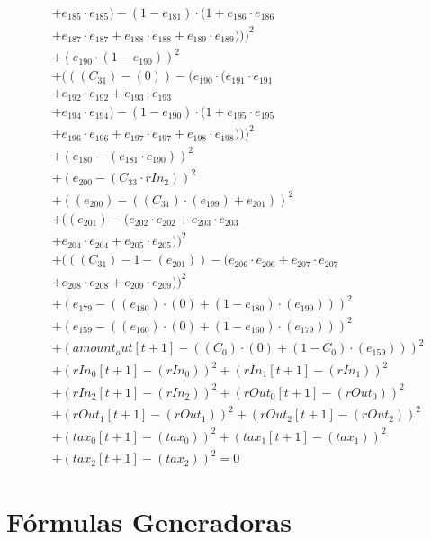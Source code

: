 \documentclass[10pt, a4paper]{article}
\begin{document}
\begin{align*}
& + e_{185} \cdot e_{185}) - (1 - e_{181}) \cdot (1 + e_{186} \cdot e_{186} \\
& + e_{187} \cdot e_{187} + e_{188} \cdot e_{188} + e_{189} \cdot e_{189})))^{2} \\
& + (e_{190} \cdot (1 - e_{190}))^{2} \\
& + (((C_{31}) - (0)) - (e_{190} \cdot (e_{191} \cdot e_{191} \\
& + e_{192} \cdot e_{192} + e_{193} \cdot e_{193} \\
& + e_{194} \cdot e_{194}) - (1 - e_{190}) \cdot (1 + e_{195} \cdot e_{195} \\
& + e_{196} \cdot e_{196} + e_{197} \cdot e_{197} + e_{198} \cdot e_{198})))^{2} \\
& + (e_{180} - (e_{181} \cdot e_{190}))^{2} \\
& + (e_{200} - (C_{33}  \cdot  rIn_2))^{2} \\
& + ((e_{200}) - ((C_{31})  \cdot  (e_{199}) + e_{201}))^{2} \\
& + ((e_{201}) - (e_{202} \cdot e_{202} + e_{203} \cdot e_{203} \\
& + e_{204} \cdot e_{204} + e_{205} \cdot e_{205}))^{2} \\
& + (((C_{31}) - 1 - (e_{201})) - (e_{206} \cdot e_{206} + e_{207} \cdot e_{207} \\
& + e_{208} \cdot e_{208} + e_{209} \cdot e_{209}))^{2} \\
& + (e_{179} - ((e_{180})  \cdot  (0) + (1 - e_{180})  \cdot  (e_{199})))^{2} \\
& + (e_{159} - ((e_{160})  \cdot  (0) + (1 - e_{160})  \cdot  (e_{179})))^{2} \\
& + (amount_out[t+1] - ((C_{0})  \cdot  (0) + (1 - C_{0})  \cdot  (e_{159})))^{2} \\
& + (rIn_0[t+1] - (rIn_0))^{2} + (rIn_1[t+1] - (rIn_1))^{2} \\
& + (rIn_2[t+1] - (rIn_2))^{2} + (rOut_0[t+1] - (rOut_0))^{2} \\
& + (rOut_1[t+1] - (rOut_1))^{2} + (rOut_2[t+1] - (rOut_2))^{2} \\
& + (tax_0[t+1] - (tax_0))^{2} + (tax_1[t+1] - (tax_1))^{2} \\
& + (tax_2[t+1] - (tax_2))^{2} = 0
\end{align*}\part{Fórmulas Generadoras}
\end{document}
